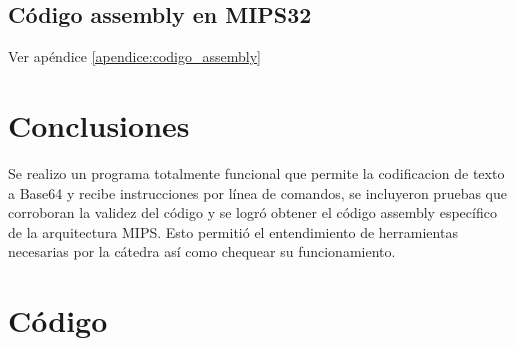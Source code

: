\documentclass[titlepage,a4paper]{article}
\begin{document}
\subsection{Código assembly en MIPS32}
Ver apéndice \ref{apendice:codigo_assembly}

\section{Conclusiones}

Se realizo un programa totalmente funcional que permite la codificacion de texto a Base64 y recibe instrucciones por línea de comandos, se incluyeron pruebas que corroboran la validez del código y se logró obtener el código assembly específico de la arquitectura MIPS. Esto permitió el entendimiento de herramientas necesarias por la cátedra así como chequear su funcionamiento.

\newpage
\appendix
\section{Código}
\end{document}
